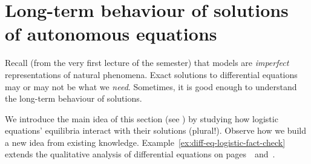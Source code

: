 \documentclass[../main.tex]{subfiles}
\begin{document}
 \section{Long-term behaviour of solutions of autonomous equations}

Recall (from the very first lecture of the semester) that models are \emph{imperfect} representations of natural phenomena. Exact solutions to differential equations may or may not be what we \emph{need}. Sometimes, it is good enough to understand the long-term behaviour of solutions.

We introduce the main idea of this section (see \faStar{}) by studying how logistic equations' equilibria interact with their solutions (plural!). Observe how we build a new idea from existing knowledge. Example~\ref{ex:diff-eq-logistic-fact-check} extends the qualitative analysis of differential equations on pages~\pageref{method:diff-eq-model}~and~\pageref{ex:diff-eq-logistic-fact-check}.
\end{document}
